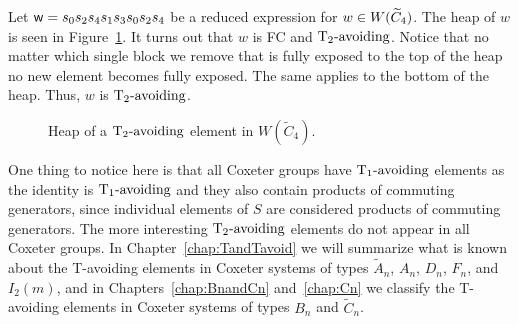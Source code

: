 %

\begin{example}
Let $\mathsf{w}=s_0s_2s_4s_1s_3s_0s_2s_4$ be a reduced expression for $w \in W(\widetilde{C}_4)$. The heap of $w$ is seen in Figure~\ref{fig:sandwich1}. It turns out that $w$ is FC and $\operatorname{T_2-\mathrm{avoiding}}$. Notice that no matter which single block we remove that is fully exposed to the top of the heap no new element becomes fully exposed. The same applies to the bottom of the heap. Thus, $w$ is $\operatorname{T_2-\mathrm{avoiding}}$. 
\begin{figure}[h!]
\centering
{}
\caption{Heap of a $\operatorname{T_2-\mathrm{avoiding}}$ element in $W(\widetilde{C}_4)$.}\label{fig:sandwich1}	
\end{figure}
\end{example}


One thing to notice here is that all Coxeter groups have $\operatorname{T_1-\mathrm{avoiding}}$ elements as the identity is $\operatorname{T_1-\mathrm{avoiding}}$ and  they also contain products of commuting generators, since individual elements of $S$ are considered products of commuting generators. The more interesting $\operatorname{T_2-\mathrm{avoiding}}$ elements do not appear in all Coxeter groups. In Chapter~\ref{chap:TandTavoid} we will summarize what is known about the T-avoiding elements in Coxeter systems of types $\widetilde{A}_n$, $A_n$, $D_n$, $F_n$, and $I_2(m)$, and in Chapters~\ref{chap:BnandCn} and~\ref{chap:Cn} we classify the T-avoiding elements in Coxeter systems of types $B_n$ and $\widetilde{C}_n$. 


